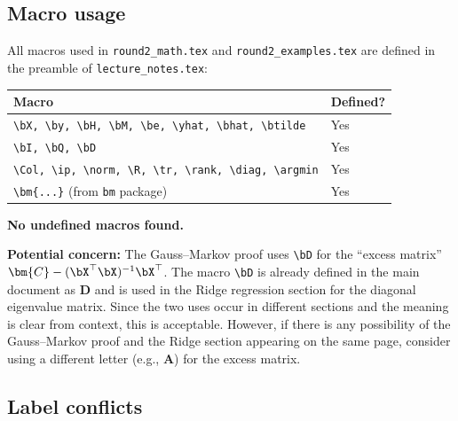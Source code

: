 \subsection*{Macro usage}

All macros used in \texttt{round2\_math.tex} and \texttt{round2\_examples.tex}
are defined in the preamble of \texttt{lecture\_notes.tex}:

\begin{center}
\renewcommand{\arraystretch}{1.1}
\begin{tabular}{ll}
\toprule
Macro & Defined? \\
\midrule
\verb|\bX, \by, \bH, \bM, \be, \yhat, \bhat, \btilde| & Yes \\
\verb|\bI, \bQ, \bD| & Yes \\
\verb|\Col, \ip, \norm, \R, \tr, \rank, \diag, \argmin| & Yes \\
\verb|\bm{...}| (from \texttt{bm} package) & Yes \\
\bottomrule
\end{tabular}
\end{center}

\noindent\textbf{No undefined macros found.}

\medskip
\noindent\textbf{Potential concern:} The Gauss--Markov proof uses
\verb|\bD| for the ``excess matrix'' $\bm{C} - (\bX^\top\bX)^{-1}\bX^\top$.
The macro \verb|\bD| is already defined in the main document as
$\bm{D}$ and is used in the Ridge regression section for the diagonal
eigenvalue matrix.  Since the two uses occur in different sections and
the meaning is clear from context, this is acceptable.  However, if
there is any possibility of the Gauss--Markov proof and the Ridge
section appearing on the same page, consider using a different letter
(e.g., $\bm{A}$) for the excess matrix.


\subsection*{Label conflicts}

